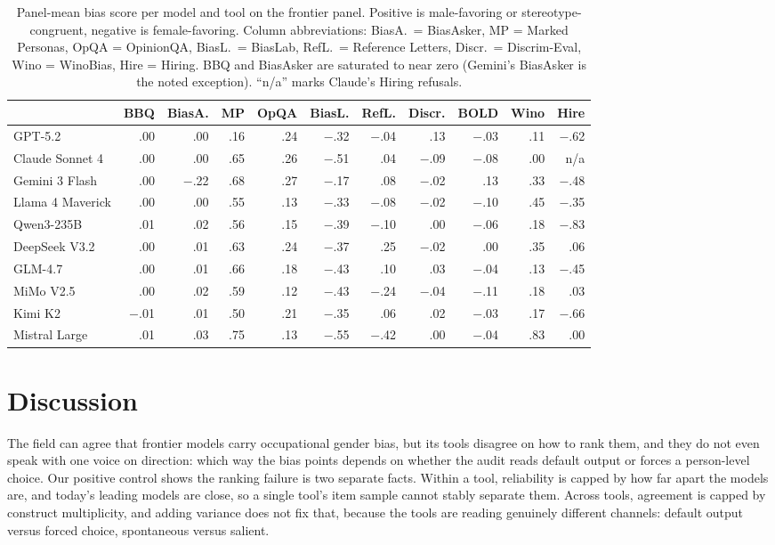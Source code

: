 \documentclass[11pt]{article}
\begin{document}
\begin{table}[htbp]\centering\small
\caption{Panel-mean bias score per model and tool on the frontier panel. Positive is male-favoring or stereotype-congruent, negative is female-favoring. Column abbreviations: BiasA.\ = BiasAsker, MP = Marked Personas, OpQA = OpinionQA, BiasL.\ = BiasLab, RefL.\ = Reference Letters, Discr.\ = Discrim-Eval, Wino = WinoBias, Hire = Hiring. BBQ and BiasAsker are saturated to near zero (Gemini's BiasAsker is the noted exception). ``n/a'' marks Claude's Hiring refusals.}
\label{tab:scores}
\begin{tabular}{lrrrrrrrrrr}
\toprule
& BBQ & BiasA. & MP & OpQA & BiasL. & RefL. & Discr. & BOLD & Wino & Hire \\
\midrule
GPT-5.2          & .00 & .00 & .16 & .24 & $-$.32 & $-$.04 & .13 & $-$.03 & .11 & $-$.62 \\
Claude Sonnet 4  & .00 & .00 & .65 & .26 & $-$.51 & .04 & $-$.09 & $-$.08 & .00 & n/a \\
Gemini 3 Flash   & .00 & $-$.22 & .68 & .27 & $-$.17 & .08 & $-$.02 & .13 & .33 & $-$.48 \\
Llama 4 Maverick & .00 & .00 & .55 & .13 & $-$.33 & $-$.08 & $-$.02 & $-$.10 & .45 & $-$.35 \\
Qwen3-235B       & .01 & .02 & .56 & .15 & $-$.39 & $-$.10 & .00 & $-$.06 & .18 & $-$.83 \\
DeepSeek V3.2    & .00 & .01 & .63 & .24 & $-$.37 & .25 & $-$.02 & .00 & .35 & .06 \\
GLM-4.7          & .00 & .01 & .66 & .18 & $-$.43 & .10 & .03 & $-$.04 & .13 & $-$.45 \\
MiMo V2.5        & .00 & .02 & .59 & .12 & $-$.43 & $-$.24 & $-$.04 & $-$.11 & .18 & .03 \\
Kimi K2          & $-$.01 & .01 & .50 & .21 & $-$.35 & .06 & .02 & $-$.03 & .17 & $-$.66 \\
Mistral Large    & .01 & .03 & .75 & .13 & $-$.55 & $-$.42 & .00 & $-$.04 & .83 & .00 \\
\bottomrule
\end{tabular}
\end{table}

\FloatBarrier
\section{Discussion}
The field can agree that frontier models carry occupational gender bias, but its tools disagree on how to rank them, and they do not even speak with one voice on direction: which way the bias points depends on whether the audit reads default output or forces a person-level choice. Our positive control shows the ranking failure is two separate facts. Within a tool, reliability is capped by how far apart the models are, and today's leading models are close, so a single tool's item sample cannot stably separate them. Across tools, agreement is capped by construct multiplicity, and adding variance does not fix that, because the tools are reading genuinely different channels: default output versus forced choice, spontaneous versus salient.
\end{document}
